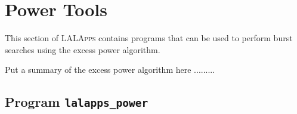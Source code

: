 \section{Power Tools}
\label{section:powertools}

This section of \textsc{LALApps} contains programs that can be used to
perform burst searches using the excess power algorithm.   

Put a summary of the excess power algorithm here .........

\clearpage


\subsection{Program \texttt{lalapps\_power}}
\label{program:lalapps-power}

